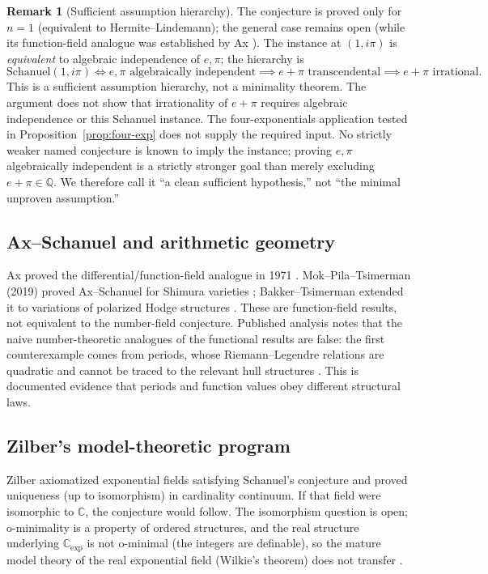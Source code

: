 \documentclass[11pt]{amsart}
\theoremstyle{definition}
\newtheorem{remark}[theorem]{Remark}
\theoremstyle{remark}
\numberwithin{equation}{section}
\newcommand{\Q}{\mathbb{Q}}
\newcommand{\C}{\mathbb{C}}
\newcommand{\ee}{e}
\begin{document}
\begin{remark}[Sufficient assumption hierarchy]
The conjecture is proved only for $n=1$ (equivalent to Hermite--Lindemann); the general case remains open \cite{Baker,MO33817} (while its function-field analogue was established by Ax \cite{Ax1971}). The instance at $(1,i\pi)$ is \emph{equivalent} to algebraic independence of $\ee,\pi$; the hierarchy is
\[
\text{Schanuel}(1,i\pi)\iff \ee,\pi\text{ algebraically independent}\implies e+\pi\text{ transcendental}\implies e+\pi\text{ irrational}.
\]
This is a sufficient assumption hierarchy, not a minimality theorem. The argument does not show that irrationality of $e+\pi$ requires algebraic independence or this Schanuel instance. The four-exponentials application tested in Proposition~\ref{prop:four-exp} does not supply the required input. No strictly weaker named conjecture is known to imply the instance; proving $\ee,\pi$ algebraically independent is a strictly stronger goal than merely excluding $e+\pi\in\Q$. We therefore call it ``a clean sufficient hypothesis,'' not ``the minimal unproven assumption.''
\end{remark}

\subsection{Ax--Schanuel and arithmetic geometry}\label{sub:ax}

Ax proved the differential/function-field analogue in 1971 \cite{Ax1971}. Mok--Pila--Tsimerman (2019) proved Ax--Schanuel for Shimura varieties \cite{MPT2019}; Bakker--Tsimerman extended it to variations of polarized Hodge structures \cite{BakkerTsimerman2019}. These are function-field results, not equivalent to the number-field conjecture. Published analysis notes that the naive number-theoretic analogues of the functional results are false: the first counterexample comes from periods, whose Riemann--Legendre relations are quadratic and cannot be traced to the relevant hull structures \cite{CambridgeFF}. This is documented evidence that periods and function values obey different structural laws.

\subsection{Zilber's model-theoretic program}\label{sub:zilber}

Zilber axiomatized exponential fields satisfying Schanuel's conjecture and proved uniqueness (up to isomorphism) in cardinality continuum. If that field were isomorphic to $\C$, the conjecture would follow. The isomorphism question is open; o-minimality is a property of ordered structures, and the real structure underlying $\C_{\exp}$ is not o-minimal (the integers are definable), so the mature model theory of the real exponential field (Wilkie's theorem) does not transfer \cite{MO33817}.
\end{document}
